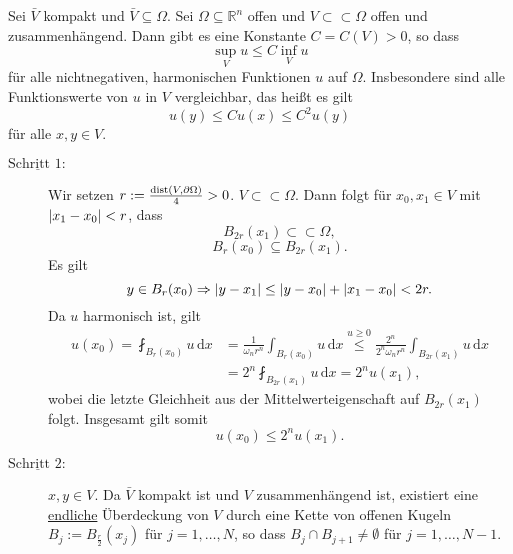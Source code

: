 \begin{satz}
	Sei $\bar{V}$ kompakt und $\bar{V} \subseteq \Omega$. Sei $\Omega \subseteq  \mathbb{R}^n$ offen und $V \subset \subset \Omega $ offen und
	zusammenhängend. Dann gibt es eine Konstante $C = C(V) >0$, so dass
	\begin{equation}
		\sup_{V}u \leq C \inf_{V}u
	\end{equation}
	für alle nichtnegativen, harmonischen Funktionen $u$ auf $\Omega$. Insbesondere sind alle Funktionswerte von $u$ in $V$ vergleichbar, das heißt es gilt
	\begin{equation}
		u(y) \leq C u(x) \leq C^2 u(y)
	\end{equation}
	für alle $x,y \in V$.
\end{satz}
\begin{beweis}
	\begin{description}
		\item[$\underline{\text{Schritt }1:}$] Wir setzen $r:= \frac{\operatorname{dist}(V,\partial \Omega)}{4} > 0$. $V \subset \subset \Omega$. Dann folgt für $x_0,x_1 \in V$ mit $\lvert x_1-x_0\rvert< r$, dass
		\begin{equation}
			B_{2r}(x_1) \subset \subset \Omega ,
		\end{equation}
		\begin{equation}
			B_r(x_0) \subseteq B_{2r}(x_1).
		\end{equation}
		Es gilt
		\begin{equation}
			y \in B_r(x_0) \Rightarrow \lvert y-x_1\rvert \leq \lvert y-x_0\rvert + \lvert x_1 - x_0\rvert < 2r.
		\end{equation}
		Da $u$ harmonisch ist, gilt
		\begin{align*}
			u(x_0) = \fint_{B_r(x_0)}^{} u \,\mathrm{d}x &= \frac{1}{\omega_n r^n} \int_{B_r(x_0)}^{}u\,\mathrm{d}x \stackrel{u \geq 0}{\leq } \frac{2^n}{2^n \omega_n r^n}
			\int_{B_{2r}(x_1)}^{}u \,\mathrm{d}x \\ &= 2^n \fint_{B_{2r}(x_1)}^{}u \,\mathrm{d}x = 2^n u(x_1),
		\end{align*}
		wobei die letzte Gleichheit aus der Mittelwerteigenschaft auf $B_{2r}(x_1)$ folgt. Insgesamt gilt somit
		\[
			u(x_0) \leq 2^n u(x_1).
		\]
		\item[$\underline{\text{Schritt }2:}$] $x,y \in V$. 
		Da $\bar{V}$ kompakt ist und $V$ zusammenhängend ist, existiert eine \underline{endliche} Überdeckung von $V$ 
		durch eine Kette von offenen Kugeln $B_j := B_{\frac{r}{2}}(x_j)$ für $j=1,\dots,N$, so dass $B_j \cap B_{j+1} \neq \emptyset$ für $j=1,\dots,N-1$.

\end{description}
\end{beweis}
